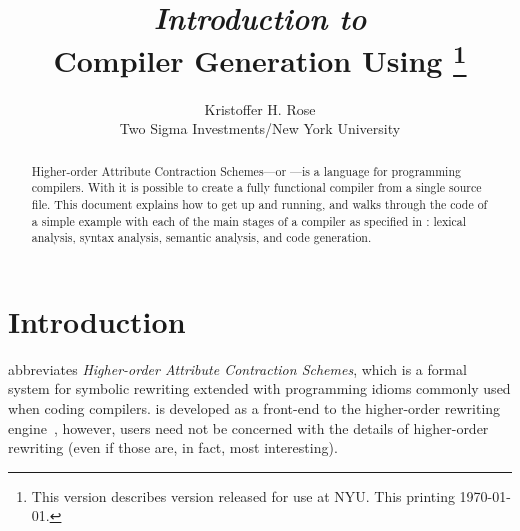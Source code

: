 \documentclass[11pt]{article} %
\title{
  \emph{Introduction to}\\
  Compiler Generation Using \HAX%
  \thanks{This version describes \HAX version \version released for use at NYU. This printing \today.}
}
\author{
  Kristoffer H. Rose\\
  Two Sigma Investments/New York University
}
\begin{document}
\maketitle

\begin{abstract}\noindent
  Higher-order Attribute Contraction Schemes---or \HAX---is a language for programming compilers.
  With \HAX it is possible to create a fully functional compiler from a single source file.  This
  document explains how to get \HAX up and running, and walks through the code of a simple example
  with each of the main stages of a compiler as specified in \HAX: lexical analysis, syntax analysis, semantic
  analysis, and code generation.
\end{abstract}

\compacttableofcontents


\section{Introduction}\label{sec:intro}

\HAX abbreviates \emph{Higher-order Attribute Contraction Schemes}, which is a formal system for
symbolic rewriting extended with programming idioms commonly used when coding compilers. \HAX is
developed as a front-end to the \CRSX higher-order rewriting engine~\cite{crsx}, however, \HAX users
need not be concerned with the details of higher-order rewriting (even if those are, in fact, most
interesting).
\end{document}
